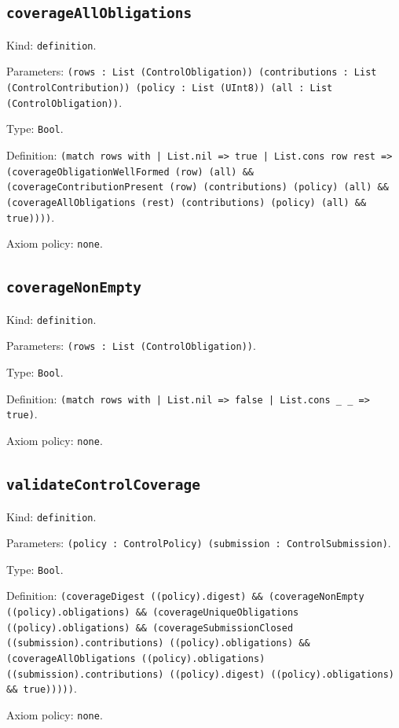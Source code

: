 \documentclass[11pt]{article}
\begin{document}
\subsection*{\texttt{coverageAllObligations}}
\noindent Kind: \texttt{definition}.\par
\noindent Parameters: \texttt{(rows : List (ControlObligation)) (contributions : List (ControlContribution)) (policy : List (UInt8)) (all : List (ControlObligation))}.\par
\noindent Type: \texttt{Bool}.\par
\noindent Definition: \texttt{(match rows with | List.nil => true | List.cons row rest => (coverageObligationWellFormed (row) (all) \&\& (coverageContributionPresent (row) (contributions) (policy) (all) \&\& (coverageAllObligations (rest) (contributions) (policy) (all) \&\& true))))}.\par
\noindent Axiom policy: \texttt{none}.\par
\subsection*{\texttt{coverageNonEmpty}}
\noindent Kind: \texttt{definition}.\par
\noindent Parameters: \texttt{(rows : List (ControlObligation))}.\par
\noindent Type: \texttt{Bool}.\par
\noindent Definition: \texttt{(match rows with | List.nil => false | List.cons \_ \_ => true)}.\par
\noindent Axiom policy: \texttt{none}.\par
\subsection*{\texttt{validateControlCoverage}}
\noindent Kind: \texttt{definition}.\par
\noindent Parameters: \texttt{(policy : ControlPolicy) (submission : ControlSubmission)}.\par
\noindent Type: \texttt{Bool}.\par
\noindent Definition: \texttt{(coverageDigest ((policy).digest) \&\& (coverageNonEmpty ((policy).obligations) \&\& (coverageUniqueObligations ((policy).obligations) \&\& (coverageSubmissionClosed ((submission).contributions) ((policy).obligations) \&\& (coverageAllObligations ((policy).obligations) ((submission).contributions) ((policy).digest) ((policy).obligations) \&\& true)))))}.\par
\noindent Axiom policy: \texttt{none}.\par
\end{document}
